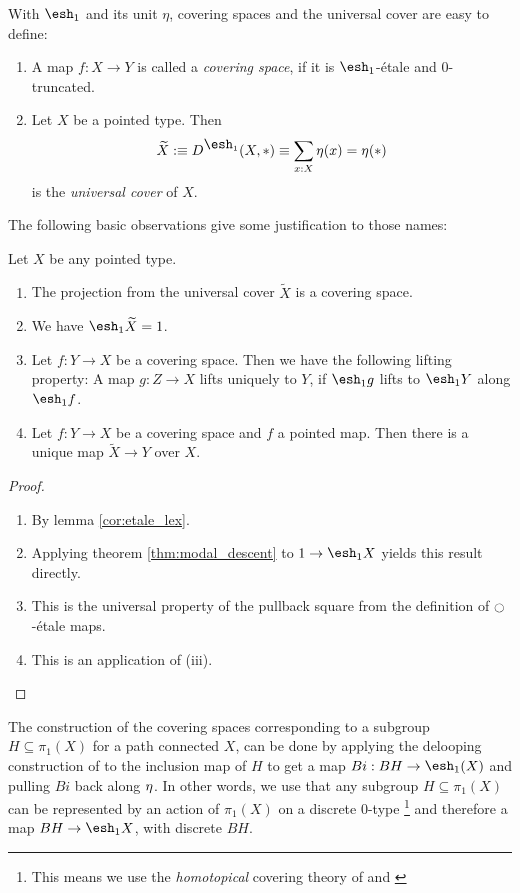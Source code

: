 \documentclass[9pt,twosided]{amsart}
\newcommand{\shape}{\ensuremath{\mathord{\raisebox{0.5pt}{\text{\rm\esh}}}}}
\begin{document}
With $\shape_1$ and its unit $\eta$, covering spaces and the universal cover are easy to define:
\begin{defn}
  \begin{enumerate}
  \item A map $f:X\to Y$ is called a \emph{covering space}, if it is $\shape_1$-étale and $0$-truncated.
  \item Let $X$ be a pointed type. Then
    \[ \widetilde{X}:\equiv D^{\shape_1}(X,\ast)\equiv\sum_{x:X}\modalunit(x)=\modalunit(\ast) \]
    is the \emph{universal cover} of $X$.
  \end{enumerate}

\end{defn}
The following basic observations give some justification to those names:
\begin{rmk}
  Let $X$ be any pointed type.
  \begin{enumerate}
  \item The projection from the universal cover $\widetilde{X}$ is a covering space.
  \item We have $\shape_1 \widetilde{X} = 1$.
  \item Let $f:Y\to X$ be a covering space. Then we have the following lifting property:
    A map $g:Z\to X$ lifts uniquely to $Y$, if $\shape_1 g$ lifts to $\shape_1 Y$ along $\shape_1 f$.
  \item Let $f:Y\to X$ be a covering space and $f$ a pointed map. Then there is a unique map $\widetilde{X}\to Y$ over $X$.
  \end{enumerate}
\end{rmk}
\begin{proof}
  \begin{enumerate}
  \item By lemma \ref{cor:etale_lex}. 
  \item Applying theorem \ref{thm:modal_descent} to $1\to \shape_1 X$ yields this result directly.
  \item This is the universal property of the pullback square from the definition of ${\ocircle}$-étale maps.
  \item This is an application of (iii).
  \end{enumerate}
\end{proof}

The construction of the covering spaces corresponding to a subgroup $H\subseteq \pi_1(X)$ for a path connected $X$,
can be done by applying the delooping construction of \cite{LicataFinster} to the inclusion map of $H$ to get a map $Bi:BH\to\shape_1(X)$ and pulling $Bi$ back along ${\eta_{}}$. In other words, we use that any subgroup $H\subseteq\pi_1(X)$ can be represented by an action of $\pi_1(X)$ on a discrete $0$-type
\footnote{This means we use the \emph{homotopical} covering theory of \cite[Section 3.1]{favonia-thesis} 
and \cite[Section 7.1]{ulrik-egbert-floris-groups}}
and therefore a map $BH\to \shape_1X$, with discrete $BH$.
\end{document}
